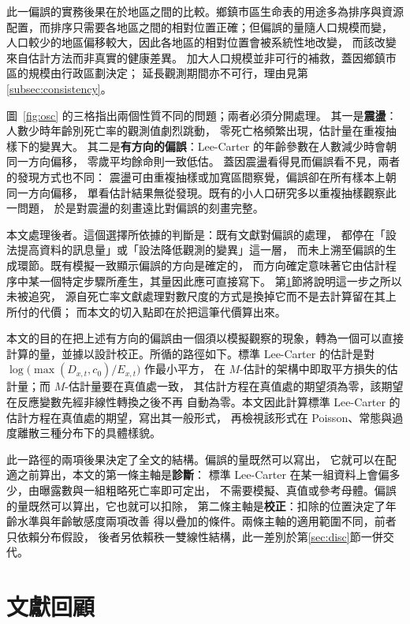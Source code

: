 \documentclass[UTF8, fontset=macnew, a4paper, 12pt]{ctexart}
\begin{document}
此一偏誤的實務後果在於地區之間的比較。鄉鎮市區生命表的用途多為排序與資源
配置，而排序只需要各地區之間的相對位置正確；但偏誤的量隨人口規模而變，
人口較少的地區偏移較大，因此各地區的相對位置會被系統性地改變，
而該改變來自估計方法而非真實的健康差異。
加大人口規模並非可行的補救，蓋因鄉鎮市區的規模由行政區劃決定；
延長觀測期間亦不可行，理由見第\ref{subsec:consistency}。

\label{subsec:problem}%
圖~\ref{fig:osc} 的三格指出兩個性質不同的問題；兩者必須分開處理。
其一是\textbf{震盪}：人數少時年齡別死亡率的觀測值劇烈跳動，
零死亡格頻繁出現，估計量在重複抽樣下的變異大。
其二是\textbf{有方向的偏誤}：Lee-Carter 的年齡參數在人數減少時會朝同一方向偏移，
零歲平均餘命則一致低估。
蓋因震盪看得見而偏誤看不見，兩者的發現方式也不同：
震盪可由重複抽樣或加寬區間察覺，偏誤卻在所有樣本上朝同一方向偏移，
單看估計結果無從發現。既有的小人口研究多以重複抽樣觀察此一問題，
於是對震盪的刻畫遠比對偏誤的刻畫完整。

本文處理後者。這個選擇所依據的判斷是：既有文獻對偏誤的處理，
都停在「設法提高資料的訊息量」或「設法降低觀測的變異」這一層，
而未上溯至偏誤的生成環節。既有模擬一致顯示偏誤的方向是確定的，
而方向確定意味著它由估計程序中某一個特定步驟所產生，其量因此應可直接寫下。
第\ref{sec:lit}節將說明這一步之所以未被追究，
源自死亡率文獻處理對數尺度的方式是換掉它而不是去計算留在其上所付的代價；
而本文的切入點即在於把這筆代價算出來。

\label{subsec:design}%
本文的目的在把上述有方向的偏誤由一個須以模擬觀察的現象，轉為一個可以直接
計算的量，並據以設計校正。所循的路徑如下。標準 Lee-Carter 的估計是對
$\log\bigl(\max(D_{x,t},c_0)/E_{x,t}\bigr)$ 作最小平方，
在 $M$-估計的架構中即取平方損失的估計量；而 $M$-估計量要在真值處一致，
其估計方程在真值處的期望須為零，該期望在反應變數先經非線性轉換之後不再
自動為零。本文因此計算標準 Lee-Carter 的估計方程在真值處的期望，寫出其一般形式，
再檢視該形式在 Poisson、常態與過度離散三種分布下的具體樣貌。

此一路徑的兩項後果決定了全文的結構。偏誤的量既然可以寫出，
它就可以在配適之前算出，本文的第一條主軸是\textbf{診斷}：
標準 Lee-Carter 在某一組資料上會偏多少，由曝露數與一組粗略死亡率即可定出，
不需要模擬、真值或參考母體。偏誤的量既然可以算出，它也就可以扣除，
第二條主軸是\textbf{校正}：扣除的位置決定了年齡水準與年齡敏感度兩項改善
得以疊加的條件。兩條主軸的適用範圍不同，前者只依賴分布假設，
後者另依賴秩一雙線性結構，此一差別於第\ref{sec:disc}節一併交代。

\section{文獻回顧}\label{sec:lit}
\end{document}
